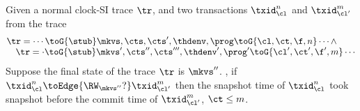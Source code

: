 \begin{lemma}[\( \RW_\mkvs \)]
    \label{lem:clock-si-rw}
    Given a normal clock-SI trace \( \tr \), and two transactions \( \txid_\cl^n \) and \( \txid_{\cl'}^m \) from the trace
    \[
        \begin{array}{@{}l@{}}
            \tr = \cdots \toG{\stub} \mkvs,\cts,\cts',\thdenv, \prog \toG{\cl,\ct,\f,n} \cdots \land \\
            \quad \tr = \cdot \toG{\stub} \mkvs',\cts'',\cts''',\thdenv', \prog' \toG{\cl',\ct',\f',m} \cdots
        \end{array}
    \]
    Suppose the final state of the trace \( \tr \) is \( \mkvs'' \).
    , if \( \txid_\cl^n \toEdge{\RW_{\mkvs''}?} \txid_{\cl'}^m \) then the snapshot time of \( \txid_{\cl}^n \) took snapshot before the commit time of \( \txid_{\cl'}^m \), \ie \( \ct \leq m \).
\end{lemma}
